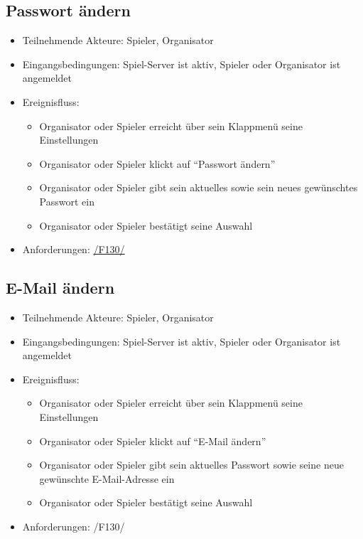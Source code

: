 \documentclass[a4paper]{scrreprt}
\begin{document}
    \subsection{Passwort ändern}
    \begin{itemize}
    \item Teilnehmende Akteure: \Gls{Spieler}, \Gls{Organisator}
    \item Eingangsbedingungen: \Gls{Spiel-Server} ist aktiv, \Gls{Spieler} oder \Gls{Organisator} ist angemeldet
    \item Ereignisfluss:
        \begin{itemize}
            \item \Gls{Organisator} oder \Gls{Spieler} erreicht über sein Klappmenü seine Einstellungen
            \item \Gls{Organisator} oder \Gls{Spieler} klickt auf \enquote{Passwort ändern}
            \item \Gls{Organisator} oder \Gls{Spieler} gibt sein aktuelles sowie sein neues gewünschtes Passwort ein
            \item \Gls{Organisator} oder \Gls{Spieler} bestätigt seine Auswahl
        \end{itemize}
        \item Anforderungen: \hyperlink{F130}{/F130/}
    \end{itemize}
	
	\subsection{E-Mail ändern}
	\begin{itemize}
		\item Teilnehmende Akteure: \Gls{Spieler}, \Gls{Organisator}
		\item Eingangsbedingungen: \Gls{Spiel-Server} ist aktiv, \Gls{Spieler} oder \Gls{Organisator} ist angemeldet
		\item Ereignisfluss:
		\begin{itemize}
			\item \Gls{Organisator} oder \Gls{Spieler} erreicht über sein Klappmenü seine Einstellungen
			\item \Gls{Organisator} oder \Gls{Spieler} klickt auf \enquote{E-Mail ändern}
			\item \Gls{Organisator} oder \Gls{Spieler} gibt sein aktuelles Passwort sowie seine neue gewünschte E-Mail-Adresse ein
			\item \Gls{Organisator} oder \Gls{Spieler} bestätigt seine Auswahl
		\end{itemize}
		\item Anforderungen: /F130/
	\end{itemize}
\end{document}
